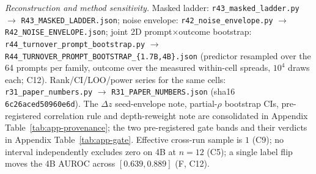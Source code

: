 \begin{table}[t]
\smallskip
\begin{minipage}{\textwidth}
\footnotesize\raggedright
\emph{Reconstruction and method sensitivity.} Masked ladder:
\texttt{r43\_masked\_ladder.py} $\rightarrow$ \texttt{R43\_MASKED\_LADDER.json}; noise envelope:
\texttt{r42\_noise\_envelope.py} $\rightarrow$ \texttt{R42\_NOISE\_ENVELOPE.json}; joint 2D
prompt$\times$outcome bootstrap: \texttt{r44\_turnover\_prompt\_bootstrap.py} $\rightarrow$
\texttt{R44\_TURNOVER\_PROMPT\_BOOTSTRAP\_\{1.7B,4B\}.json} (predictor resampled over the 64
prompts per family, outcome over the measured within-cell spreads, $10^4$ draws each; C12).
Rank/CI/LOO/power series for the same cells: \texttt{r31\_paper\_numbers.py} $\rightarrow$
\texttt{R31\_PAPER\_NUMBERS.json} (sha16 \texttt{6c26aced50960e6d}). The $\Delta z$ seed-envelope
note, partial-$\rho$ bootstrap CIs, pre-registered correlation rule and depth-reweight note are
consolidated in Appendix Table~\ref{tab:app-provenance}; the two pre-registered gate bands and
their verdicts in Appendix Table~\ref{tab:app-gate}. Effective cross-run sample is $1$ (C9);
no interval independently excludes zero on 4B at $n{=}12$ (C5); a single label flip moves the 4B
AUROC across $[0.639,0.889]$ (F, C12).
\end{minipage}
\end{table}
